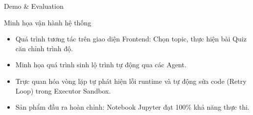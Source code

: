 \documentclass[aspectratio=169, 10pt, t]{beamer}
\begin{document}
\begin{frame}[fragile]{Demo \& Evaluation}
  \begin{block}{Minh họa vận hành hệ thống}
    \begin{itemize}
      \item Quá trình tương tác trên giao diện Frontend: Chọn topic, thực hiện bài Quiz căn chỉnh trình độ.
      \item Minh họa quá trình sinh lộ trình tự động qua các Agent.
      \item Trực quan hóa vòng lặp tự phát hiện lỗi runtime và tự động sửa code (Retry Loop) trong Executor Sandbox.
      \item Sản phẩm đầu ra hoàn chỉnh: Notebook Jupyter đạt 100\% khả năng thực thi.
    \end{itemize}
  \end{block}
\end{frame}
\end{document}
